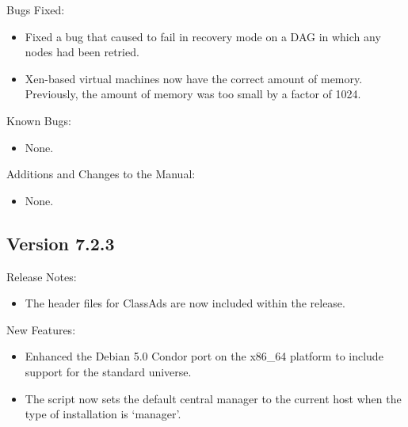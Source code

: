 \noindent Bugs Fixed:

\begin{itemize}

\item Fixed a bug that caused  to fail in recovery mode on
a DAG in which any nodes had been retried.

\item Xen-based virtual machines now have the correct amount of memory.
Previously, the amount of memory was too small by a factor of 1024.

\end{itemize}

\noindent Known Bugs:

\begin{itemize}

\item None.

\end{itemize}

\noindent Additions and Changes to the Manual:

\begin{itemize}

\item None.

\end{itemize}


\subsection*{\label{sec:New-7-2-3}Version 7.2.3}

\noindent Release Notes:

\begin{itemize}

\item The header files for ClassAds are now included within the release.

\end{itemize}

\noindent New Features:

\begin{itemize}

\item Enhanced the Debian 5.0 Condor port on the x86\_64 platform to 
include support for the standard universe. 

\item The  script now sets the default central manager
to the current host when the type of installation is `manager'.

\end{itemize}

